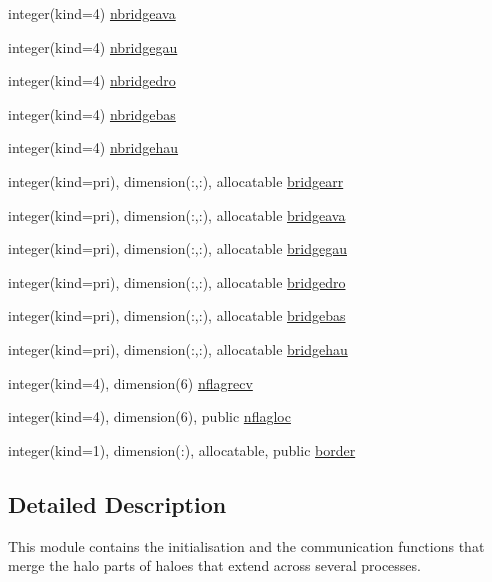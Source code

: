 \begin{DoxyCompactItemize}
integer(kind=4) \hyperlink{namespacemodfofmpi_a2ce30cec8604582ad8aaa26ef19b41cb}{nbridgeava}
\item 
integer(kind=4) \hyperlink{namespacemodfofmpi_a000b4f4f0140c24648780b86d56698cf}{nbridgegau}
\item 
integer(kind=4) \hyperlink{namespacemodfofmpi_a0253e42a34623e4816f27522252d1e29}{nbridgedro}
\item 
integer(kind=4) \hyperlink{namespacemodfofmpi_ad71e96722537b8de69afdb8f68028e8b}{nbridgebas}
\item 
integer(kind=4) \hyperlink{namespacemodfofmpi_a81ecc186519e9addf2dbf7ec92e32d23}{nbridgehau}
\item 
integer(kind=pri), dimension(\+:,\+:), allocatable \hyperlink{namespacemodfofmpi_a3dffef2edd7b2899179cb3ffffd62430}{bridgearr}
\item 
integer(kind=pri), dimension(\+:,\+:), allocatable \hyperlink{namespacemodfofmpi_a9891331c8f9f2ef3b5532b96129683ac}{bridgeava}
\item 
integer(kind=pri), dimension(\+:,\+:), allocatable \hyperlink{namespacemodfofmpi_a157af8da53311980e23d05748e181a7f}{bridgegau}
\item 
integer(kind=pri), dimension(\+:,\+:), allocatable \hyperlink{namespacemodfofmpi_a400402d1fc58970ecda00536a07c021c}{bridgedro}
\item 
integer(kind=pri), dimension(\+:,\+:), allocatable \hyperlink{namespacemodfofmpi_a2bdd3864a996f2afb8e49bbcdbd120e5}{bridgebas}
\item 
integer(kind=pri), dimension(\+:,\+:), allocatable \hyperlink{namespacemodfofmpi_a5a9577c42a1c3c53db8eb603945b530b}{bridgehau}
\item 
integer(kind=4), dimension(6) \hyperlink{namespacemodfofmpi_aa8c0fc08baf8d208d7e2cddd0600ff99}{nflagrecv}
\item 
integer(kind=4), dimension(6), public \hyperlink{namespacemodfofmpi_a9b2252c09a83a3f47fc6aec6462a68dc}{nflagloc}
\item 
integer(kind=1), dimension(\+:), allocatable, public \hyperlink{namespacemodfofmpi_adb1afd2b26b96173f56ab37495e99e99}{border}
\end{DoxyCompactItemize}


\subsection{Detailed Description}
This module contains the initialisation and the communication functions that merge the halo parts of haloes that extend across several processes. 

